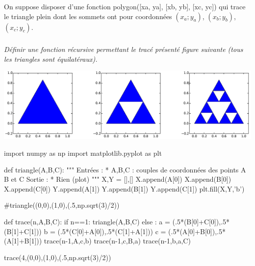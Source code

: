 \documentclass[10pt,fleqn]{book} %
\begin{document}
\begin{multicols}{2}
On suppose disposer d’une fonction \textsf{polygon([xa, ya], [xb, yb], [xc, yc])} qui trace le
triangle plein dont les sommets ont pour coordonnées $(x_a;y_a)$, $(x_b;y_b)$, $(x_c;y_c)$. 
\subparagraph{}
\textit{Définir une fonction récursive permettant le tracé présenté figure suivante (tous les triangles sont équilatéraux).}

\begin{center}
\includegraphics[width=.95\linewidth]{images/fig_04}
\end{center}

\ifprof
\begin{corrige}
\begin{python}
import numpy as np
import matplotlib.pyplot as plt

def triangle(A,B,C):
    """
    Entrées :
     * A,B,C : couples de coordonnées des points A B et C
    Sortie : 
     * Rien (plot) 
    """
    X,Y = [],[]
    X.append(A[0])
    X.append(B[0])
    X.append(C[0])
    Y.append(A[1])
    Y.append(B[1])
    Y.append(C[1])
    plt.fill(X,Y,'b')

#triangle((0,0),(1,0),(.5,np.sqrt(3)/2))

def trace(n,A,B,C):
    if n==1:
        triangle(A,B,C)
    else :
        a = (.5*(B[0]+C[0]),.5*(B[1]+C[1]))
        b = (.5*(C[0]+A[0]),.5*(C[1]+A[1]))
        c = (.5*(A[0]+B[0]),.5*(A[1]+B[1]))
        trace(n-1,A,c,b)
        trace(n-1,c,B,a)
        trace(n-1,b,a,C)
        
trace(4,(0,0),(1,0),(.5,np.sqrt(3)/2))        
\end{python}
\end{corrige}
\else
\fi



\ifprof
\else
\end{multicols}
\fi
\end{document}
